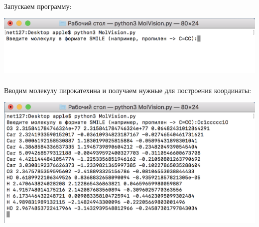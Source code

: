 \documentclass[a4paper,12pt]{article}
\begin{document}
\paragraph{} Запускаем программу:

\begin{center}
    \includegraphics[width=1\textwidth]{enter.png}\par\vspace{1 cm}
\end{center} 

\paragraph{} Вводим молекулу пирокатехина и получаем нужные для построения координаты:
\begin{center}
    \includegraphics[width=1\textwidth]{table.png}\par\vspace{1 cm}
\end{center} 
\end{document}
